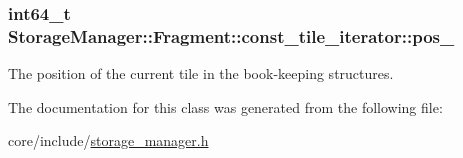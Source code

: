 \subsubsection[{pos\+\_\+}]{\setlength{\rightskip}{0pt plus 5cm}int64\+\_\+t Storage\+Manager\+::\+Fragment\+::const\+\_\+tile\+\_\+iterator\+::pos\+\_\+\hspace{0.3cm}{\ttfamily [private]}}\label{classStorageManager_1_1Fragment_1_1const__tile__iterator_a3b800ee4b5a8358606e261e21b3a56f5}
The position of the current tile in the book-\/keeping structures. 

The documentation for this class was generated from the following file\+:\begin{DoxyCompactItemize}
\item 
core/include/\hyperlink{storage__manager_8h}{storage\+\_\+manager.\+h}\end{DoxyCompactItemize}
